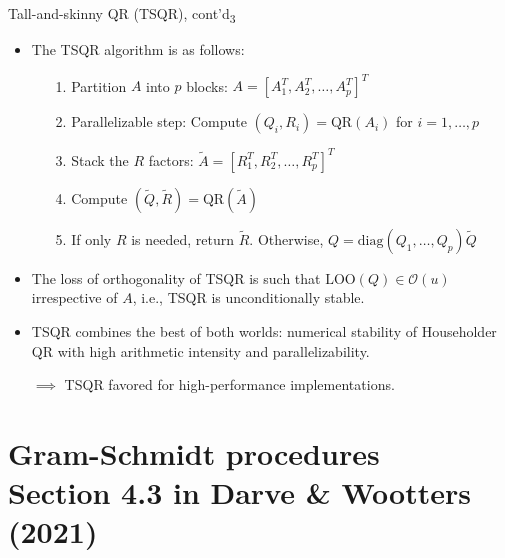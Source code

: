 \documentclass[t,usepdftitle=false]{beamer}
\begin{document}
\begin{frame}{Tall-and-skinny QR (TSQR), cont'd\textsubscript{3}}
\begin{itemize}
\item The TSQR algorithm is as follows:
\begin{itemize}
\item[1.] Partition $A$ into $p$ blocks: $A = [A_1^T, A_2^T, \ldots, A_p^T]^T$\vspace{.1cm}
\item[2.] Parallelizable step: Compute $(Q_i, R_i) = \text{QR}(A_i)$ for $i = 1, \ldots, p$\vspace{.1cm}
\item[3.] Stack the $R$ factors: $\tilde{A} = [R_1^T, R_2^T, \ldots, R_p^T]^T$\vspace{.1cm}
\item[4.] Compute $(\tilde{Q}, \tilde{R}) = \text{QR}(\tilde{A})$\vspace{.1cm}
\item[5.] If only $R$ is needed, return $\tilde{R}$. Otherwise, $Q = \text{diag}(Q_1, \ldots, Q_p) \tilde{Q}$
\end{itemize}
\item The loss of orthogonality of TSQR is such that $\text{LOO}(Q)\in\mathcal{O}(u)$ irrespective of $A$, i.e., TSQR is unconditionally stable.
\item TSQR combines the best of both worlds: numerical stability of Householder QR with high arithmetic intensity and parallelizability.
\item[]\begin{center}$\implies$ TSQR favored for high-performance implementations.\end{center}
\end{itemize}
\end{frame}

\section{Gram-Schmidt procedures\\{\small Section 4.3 in Darve \& Wootters (2021)}}
\end{document}
